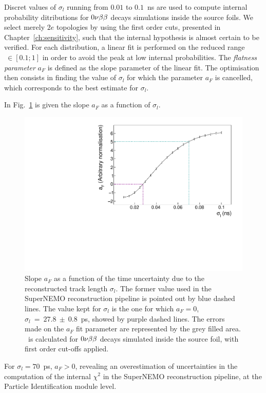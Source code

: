 Discret values of $\sigma_{l}$ running from $0.01$ to $0.1$~ns are used to compute internal probability ditributions for $0\nu\beta\beta$ decays simulations inside the source foils.
We select merely $2e$ topologies by using the first order cuts, presented in Chapter~\ref{ch:sensitivity}, such that the internal hypothesis is almost certain to be verified.
For each distribution, a linear fit is performed on the reduced range \Pint$~\in[0.1;1]$ in order to avoid the peak at low internal probabilities.
The \emph{flatness parameter} $a_{F}$ is defined as the slope parameter of the linear fit.
The optimisation then consists in finding the value of $\sigma_{l}$ for which the parameter $a_{F}$ is cancelled, which corresponds to the best estimate for $\sigma_{l}$.

In Fig.~\ref{fig:flatness} is given the slope $a_{F}$ as a function of $\sigma_{l}$.
\begin{figure}[!h]
  \centering
  \includegraphics[width=13cm]{timedifference/fig_timediff/flatness.pdf}
  \caption{Slope $a_{F}$ as a function of the time uncertainty due to the reconstructed track length $\sigma_{l}$.
    The former value used in the SuperNEMO reconstruction pipeline is pointed out by blue dashed lines.
    The value kept for $\sigma_{l}$ is the one for which $a_{F}=0$, $\sigma_{l}~=~27.8~\pm~0.8$~ps, showed by purple dashed lines.
    The errors made on the $a_{F}$ fit parameter are represented by the grey filled area.
    \Pint\ is calculated for $0\nu\beta\beta$ decays simulated inside the source foil, with first order cut-offs applied.
    \label{fig:flatness}}
\end{figure}
For $\sigma_{l}=70$~ps, $a_{F}>0$, revealing an overestimation of uncertainties in the computation of the internal $\chi^{2}$ in the SuperNEMO reconstruction pipeline, at the Particle Identification module level.
